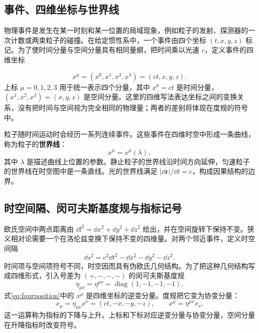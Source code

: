\documentclass[style=classic,color=full]{lc-article}
\begin{document}
\subsection{事件、四维坐标与世界线}

物理事件是发生在某一时刻和某一位置的局域现象，例如粒子的发射、探测器的一次计数或两束粒子的碰撞。在给定惯性系中，一个事件由四个坐标 $(t,x,y,z)$ 标记。为了使时间分量与空间分量具有相同量纲，把时间乘以光速 $c$，定义事件的四维坐标

\begin{equation}
  x^\mu=(x^0,x^1,x^2,x^3)=(ct,x,y,z).
  \label{eq:fourposition}
\end{equation}
上标 $\mu=0,1,2,3$ 用于统一表示四个分量，其中 $x^0=ct$ 是时间分量，$(x^1,x^2,x^3)=(x,y,z)$ 是空间分量。这里的四维写法表达坐标之间的变换关系，没有把时间与空间视为完全相同的物理量；两者的差别将体现在度规的符号中。

粒子随时间运动时会经历一系列连续事件。这些事件在四维时空中形成一条曲线，称为粒子的\textbf{世界线}：
\begin{equation}
  x^\mu=x^\mu(\lambda),
\end{equation}
其中 $\lambda$ 是描述曲线上位置的参数。静止粒子的世界线沿时间方向延伸，匀速粒子的世界线在时空图中是一条直线。光的世界线满足 $\lvert\dd\bm r\rvert/\dd t=c$，构成因果结构的边界。

\subsection{时空间隔、闵可夫斯基度规与指标记号}

欧氏空间中两点距离由 $\dd l^2=\dd x^2+\dd y^2+\dd z^2$ 给出，并在空间旋转下保持不变。狭义相对论需要一个在洛伦兹变换下保持不变的四维量。对两个邻近事件，定义时空间隔
\begin{equation}
  \dd s^2=c^2\dd t^2-\dd x^2-\dd y^2-\dd z^2.
  \label{eq:interval}
\end{equation}
时间项与空间项符号不同，时空因而具有伪欧氏几何结构。为了把这种几何结构写成四维形式，引入号差为 $(+,-,-,-)$ 的闵可夫斯基度规
\begin{equation}
  \eta_{\mu\nu}=\eta^{\mu\nu}
  =\operatorname{diag}(1,-1,-1,-1).
  \label{eq:minkowskimetric}
\end{equation}
式\eqref{eq:fourposition}中的 $x^\mu$ 是四维坐标的逆变分量。度规把它变为协变分量：
\begin{equation}
  x_\mu=\eta_{\mu\nu}x^\nu=(ct,-x,-y,-z),
  \qquad
  x^\mu=\eta^{\mu\nu}x_\nu.
  \label{eq:indexlowering}
\end{equation}
这一运算称为指标的下降与上升。上标和下标对应逆变分量与协变分量，空间分量在升降指标时改变符号。
\end{document}
